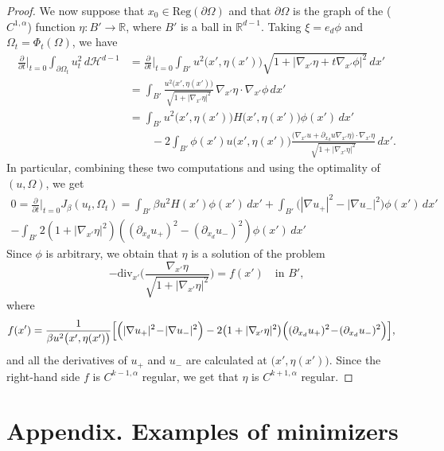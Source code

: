 \documentclass[JEP,XML,SOM,Unicode]{cedram}
\theoremstyle{plain}
\theoremstyle{definition}
\def\R{\mathbb{R}}
\def\HH{\mathcal{H}}
\begin{document}
\begin{proof}
We now suppose that $x_0\in \text{Reg}(\partial\Omega)$ and that $\partial \Omega$ is the graph of the ($C^{1,\alpha}$) function $\eta:B'\to\R$, where $B'$ is a ball in $\R^{d-1}$.
Taking $\xi=e_d\phi$ and $\Omega_t=\Phi_t(\Omega)$, we have
\begin{align*}
\frac{\partial}{\partial t}\Big\vert_{t=0}\int_{\partial\Omega_t}u_t^2\,d\HH^{d-1}&=\frac{\partial}{\partial t}\Big\vert_{t=0}\int_{B'}u^2\big(x',\eta(x')\big)\sqrt{1+|\nabla_{\!x'}\eta+t\nabla_{\!x'}\phi|^2}\,dx'\\
&=\int_{B'}\frac{u^2\big(x',\eta(x')\big)}{\sqrt{1+|\nabla_{\!x'}\eta|^2}}\,\nabla_{\!x'}\eta\cdot\nabla_{\!x'}\phi\,dx'\\
&=\int_{B'}u^2\big(x',\eta(x')\big)H\big(x',\eta(x')\big)\phi(x')\,dx'\\
&\qquad -2\int_{B'}\phi(x')u\big(x',\eta(x')\big)\frac{\big(\nabla_{\!x'}u+\partial_{x_d}u\nabla_{\!x'}\eta\big)\cdot\nabla_{\!x'}\eta}{\sqrt{1+|\nabla_{\!x'}\eta|^2}}\,dx'.
\end{align*}
In particular, combining these two computations and using the optimality of $(u,\Omega)$, we get
\begin{multline*}
0=\frac{\partial}{\partial t}\Big\vert_{t=0}J_\beta(u_t,\Omega_t)=\int_{B'}\beta u^2 H(x')\phi(x')\,dx'+\int_{B'}\big(|\nabla u_+|^2-|\nabla u_-|^2\big)\phi(x')\,dx'\\
-\int_{B'}2\left(1+|\nabla_{\!x'}\eta|^2\right)\left((\partial_{x_d} u_+)^2-(\partial_{x_d}u_-)^2\right)\phi(x')\,dx'
\end{multline*}
Since $\phi$ is arbitrary, we obtain that $\eta$ is a solution of the problem
\[-\text{div}_{x'}\biggl(\frac{\nabla_{\!x'}\eta}{\sqrt{1+|\nabla_{\!x'}\eta|^2}}\biggr)=f(x')\quad\text{in } B',\]
where
\begin{align*}
f(x')&=\frac1{\beta u^2\big(x',\eta(x')\big)}\Bigl[\Bigl(|\nabla u_+|^2\!-\!|\nabla u_-|^2\Bigr)-2\big(1+|\nabla_{\!x'}\eta|^2\big)\Bigl((\partial_{x_d} u_+)^2\!-\!(\partial_{x_d}u_-)^2\Bigr)\Bigr],
\end{align*}
and all the derivatives of $u_+$ and $u_-$ are calculated at $\big(x',\eta(x')\big)$. Since the right-hand side $f$ is $C^{k-1,\alpha}$ regular, we get that $\eta$ is $C^{k+1,\alpha}$ regular.
\end{proof}

\appendix

\section*{Appendix. Examples of minimizers}
\end{document}
